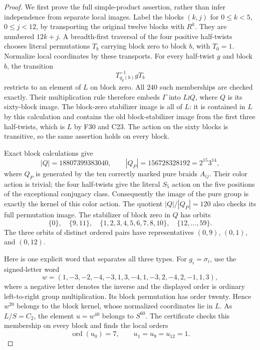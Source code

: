 \begin{proof}
We first prove the full simple-product assertion, rather than
infer independence from separate local images. Label the blocks
$(k,j)$ for $0\leq k<5$, $0\leq j<12$, by transporting the original
twelve blocks with $R^k$. They are numbered $12k+j$.
A breadth-first traversal of the four positive half-twists
chooses literal permutations $T_b$ carrying block zero to block
$b$, with $T_0=1$. Normalize local coordinates by these transports.
For every half-twist $g$ and block $b$, the transition
\[
                    T_{q_g(b)}^{-1}gT_b
\]
restricts to an element of $L$ on block zero. All $240$ such
memberships are checked exactly. Their multiplication rule
therefore embeds $\Gamma$ into $L\wr Q$, where $Q$ is its
sixty-block image. The block-zero stabilizer image is all of
$L$: it is contained in $L$ by this calculation and contains
the old block-stabilizer image from the first three half-twists,
which is $L$ by F30 and C23. The action on the sixty blocks is
transitive, so the same assertion holds on every block.

Exact block calculations give
\[
 |Q|=18807399383040,\qquad
 |Q_P|=156728328192=2^{15}3^{14},
\]
where $Q_P$ is generated by the ten correctly marked pure
braids $A_{ij}$. Their color action is trivial; the four
half-twists give the literal $S_5$ action on the five positions
of the exceptional conjugacy class. Consequently the image
of the pure group is exactly the kernel of this color action.
The quotient $|Q|/|Q_P|=120$ also checks its full permutation
image. The stabilizer of block zero in $Q$ has orbits
\[
 \{0\},\quad \{9,11\},\quad
 \{1,2,3,4,5,6,7,8,10\},\quad \{12,\ldots,59\}.
\]
The three orbits of distinct ordered pairs have representatives
$(0,9)$, $(0,1)$, and $(0,12)$.

Here is one explicit word that separates all three types.
For $g_i=\sigma_i$, use the signed-letter word
\[
 w=(1,-3,-2,-4,-3,1,3,-4,1,-3,2,-4,2,-1,1,3),
\]
where a negative letter denotes the inverse and the displayed
order is ordinary left-to-right group multiplication. Its
block permutation has order twenty. Hence $w^{20}$ belongs to
the block kernel, whose normalized coordinates lie in $L$.
As $L/S=C_2$, the element $u=w^{40}$ belongs to $S^{60}$.
The certificate checks this membership on every block and
finds the local orders
\[
       \operatorname{ord}(u_0)=7,\qquad
       u_1=u_9=u_{12}=1.
\]


\end{proof}
